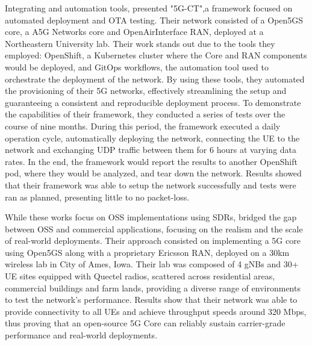 Integrating  and automation tools, \textcite{bonati2025_5gct} presented "5G-CT",a framework focused on automated deployment and \gls{OTA} testing. Their network consisted of a Open5GS core, a A5G Networks core and OpenAirInterface \gls{RAN}, deployed at a Northeastern University lab.
Their work stands out due to the tools they employed: OpenShift, a Kubernetes cluster where the Core and \gls{RAN} components would be deployed, and GitOps workflows, the automation tool used to orchestrate the deployment of the network. By using these tools, they automated the provisioning of their 5G networks, effectively streamlining the setup and guaranteeing a consistent and reproducible deployment process.
To demonstrate the capabilities of their framework, they conducted a series of tests over the course of nine months. During this period, the framework executed a daily operation cycle, automatically deploying the network, connecting the \gls{UE} to the network and exchanging UDP traffic between them for 6 hours at varying data rates. In the end, the framework would report the results to another OpenShift pod, where they would be analyzed, and tear down the network.
Results showed that their framework was able to setup the network successfully and tests were ran as planned, presenting little to no packet-loss.\bigskip

While these works focus on \gls{OSS} implementations using \glspl{SDR}, \textcite{zu2025realworld} bridged the gap between \gls{OSS} and commercial applications, focusing on the realism and the scale of real-world deployments. Their approach consisted on implementing a 5G core using Open5GS along with a proprietary Ericsson \gls{RAN}, deployed on a 30km wireless lab in City of Ames, Iowa.
Their lab was composed of 4 \glspl{gNB} and 30+ \gls{UE} sites equipped with Quectel radios, scattered across residential areas, commercial buildings and farm lands, providing a diverse range of environments to test the network's performance. Results show that their network was able to provide connectivity to all \glspl{UE} and achieve throughput speeds around 320 Mbps, thus proving that an open-source 5G Core can reliably sustain carrier-grade performance and real-world deployments. 

